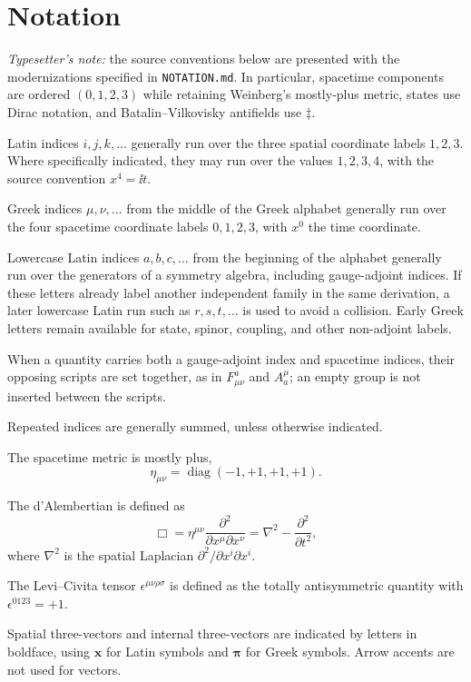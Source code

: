 \section*{Notation}

\emph{Typesetter's note:} the source conventions below are presented with the
modernizations specified in \texttt{NOTATION.md}. In particular, spacetime
components are ordered $(0,1,2,3)$ while retaining Weinberg's mostly-plus
metric, states use Dirac notation, and Batalin--Vilkovisky antifields use
\(\ddagger\).

Latin indices \(i,j,k,\ldots\) generally run over the three spatial coordinate
labels \(1,2,3\). Where specifically indicated, they may run over the values
\(1,2,3,4\), with the source convention \(x^4=\ii t\).

Greek indices \(\mu,\nu,\ldots\) from the middle of the Greek alphabet
generally run over the four spacetime coordinate labels \(0,1,2,3\), with
\(x^0\) the time coordinate.

Lowercase Latin indices \(a,b,c,\ldots\) from the beginning of the alphabet
generally run over the generators of a symmetry algebra, including
gauge-adjoint indices. If these letters already label another independent
family in the same derivation, a later lowercase Latin run such as
\(r,s,t,\ldots\) is used to avoid a collision. Early Greek letters remain
available for state, spinor, coupling, and other non-adjoint labels.

When a quantity carries both a gauge-adjoint index and spacetime indices,
their opposing scripts are set together, as in
\(F^a_{\mu\nu}\) and \(A_a^\mu\);
an empty group is not inserted between the scripts.

Repeated indices are generally summed, unless otherwise indicated.

The spacetime metric is mostly plus,
\[
  \eta_{\mu\nu}=\operatorname{diag}(-1,+1,+1,+1).
\]

The d'Alembertian is defined as
\[
  \Box=\eta^{\mu\nu}
  \frac{\partial^2}{\partial x^\mu\partial x^\nu}
  =\nabla^2-\frac{\partial^2}{\partial t^2},
\]
where \(\nabla^2\) is the spatial Laplacian
\(\partial^2/\partial x^i\partial x^i\).

The Levi--Civita tensor \(\epsilon^{\mu\nu\rho\sigma}\) is defined as the
totally antisymmetric quantity with \(\epsilon^{0123}=+1\).

Spatial three-vectors and internal three-vectors are indicated by letters in
boldface, using \(\mathbf{x}\) for Latin symbols and \(\boldsymbol{\pi}\) for
Greek symbols. Arrow accents are not used for vectors.

